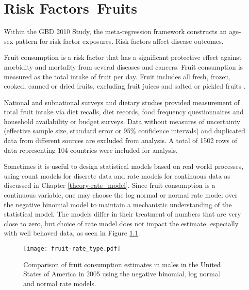 \chapter{Risk Factors--Fruits}
\label{applications-log_normal}

Within the GBD 2010 Study, the meta-regression framework constructs an age-sex pattern for risk factor exposures.  Risk factors affect disease outcomes.

Fruit consumption is a risk factor that has a significant protective effect against morbidity and mortality from several diseases and cancers.  Fruit consumption is measured as the total intake of fruit per day.  Fruit includes all fresh, frozen, cooked, canned or dried fruits, excluding fruit juices and salted or pickled fruits \cite{he_increased_2007, boeing_intake_2006}.

National and subnational surveys and dietary studies provided measurement of total fruit intake via diet recalls, diet records, food frequency questionnaires and household availability or budget surveys.  Data without measures of uncertainty (effective sample size, standard error or 95\% confidence intervals) and duplicated data from different sources are excluded from analysis.  A total of 1502 rows of data representing 104 countries were included for analysis.

Sometimes it is useful to design statistical models based on real world processes, using count models for discrete data and rate models for continuous data as discussed in Chapter \ref{theory-rate_model}.  Since fruit consumption is a continuous variable, one may choose the log normal or normal rate model over the negative binomial model to maintain a mechanistic understanding of the statistical model.  The models differ in their treatment of numbers that are very close to zero, but choice of rate model does not impact the estimate, especially with well behaved data, as seen in Figure \ref{fig:app-fruit rate type}.

    \begin{figure}[h]
        \begin{center}
            \texttt{[image: fruit-rate\_type.pdf]}
            \caption{Comparison of fruit consumption estimates in males in the United States of America in 2005 using the negative binomial, log normal and normal rate models.}
            \label{fig:app-fruit rate type}
        \end{center}
    \end{figure} 